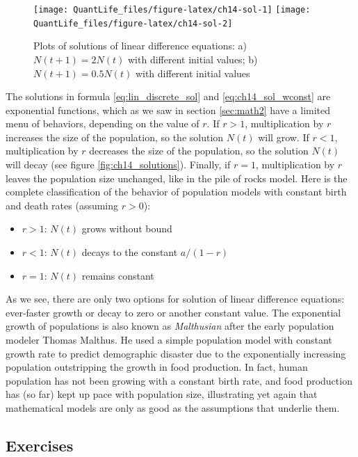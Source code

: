 \documentclass[
]{book}
\providecommand{\tightlist}{%
  \setlength{\itemsep}{0pt}\setlength{\parskip}{0pt}}
\theoremstyle{definition}
\theoremstyle{definition}
\theoremstyle{definition}
\theoremstyle{remark}
\begin{document}
\begin{figure}

{\centering \texttt{[image: QuantLife\_files/figure-latex/ch14-sol-1]} \texttt{[image: QuantLife\_files/figure-latex/ch14-sol-2]} 

}

\caption{Plots of solutions of linear difference equations: a) $N(t+1) = 2N(t)$ with different initial values; b) $N(t+1) = 0.5N(t)$ with different initial values}\label{fig:ch14-sol}
\end{figure}

The solutions in formula \ref{eq:lin_discrete_sol} and \ref{eq:ch14_sol_wconst} are exponential functions, which as we saw in section \ref{sec:math2} have a limited menu of behaviors, depending on the value of \(r\). If \(r > 1\), multiplication by \(r\) increases the size of the population, so the solution \(N(t)\) will grow. If \(r < 1\), multiplication by \(r\) decreases the size of the population, so the solution \(N(t)\) will decay (see figure \ref{fig:ch14_solutions}). Finally, if \(r=1\), multiplication by \(r\) leaves the population size unchanged, like in the pile of rocks model. Here is the complete classification of the behavior of population models with constant birth and death rates (assuming \(r>0\)):

\begin{itemize}
\tightlist
\item
  \(r > 1\): \(N(t)\) grows without bound
\item
  \(r < 1\): \(N(t)\) decays to the constant \(a/(1-r)\)
\item
  \(r = 1\): \(N(t)\) remains constant
\end{itemize}

As we see, there are only two options for solution of linear difference equations: ever-faster growth or decay to zero or another constant value. The exponential growth of populations is also known as  \emph{Malthusian} after the early population modeler Thomas Malthus. He used a simple population model with constant growth rate to predict demographic disaster due to the exponentially increasing population outstripping the growth in food production. In fact, human population has not been growing with a constant birth rate, and food production has (so far) kept up pace with population size, illustrating yet again that mathematical models are only as good as the assumptions that underlie them.

\hypertarget{exercises-12}{%
\subsection{Exercises}\label{exercises-12}}
\end{document}
